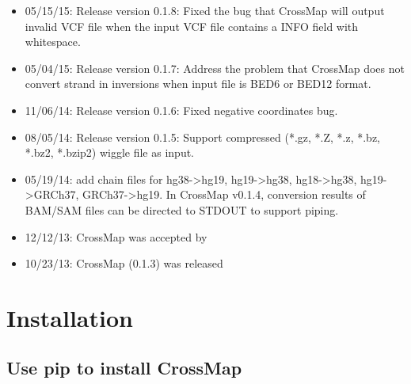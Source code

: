 \documentclass[letterpaper,10pt,english]{sphinxmanual}
\begin{document}
\begin{itemize}
\item {} 
05/15/15: Release version 0.1.8: Fixed the bug that CrossMap will output invalid VCF file when the input VCF file contains a INFO field with whitespace.

\item {} 
05/04/15: Release version 0.1.7: Address the problem that CrossMap does not convert strand in inversions when input file is BED6 or BED12 format.

\item {} 
11/06/14: Release version 0.1.6: Fixed \sphinxquotedblleft{}negative coordinates\sphinxquotedblright{} bug.

\item {} 
08/05/14: Release version 0.1.5: Support compressed (*.gz, *.Z, *.z, *.bz, *.bz2, *.bzip2) wiggle file as input.

\item {} 
05/19/14: add chain files for hg38-\textgreater{}hg19, hg19-\textgreater{}hg38, hg18-\textgreater{}hg38, hg19-\textgreater{}GRCh37, GRCh37-\textgreater{}hg19. In CrossMap v0.1.4, conversion results of BAM/SAM files can be directed to STDOUT to support piping.

\item {} 
12/12/13: CrossMap was accepted by 

\item {} 
10/23/13: CrossMap (0.1.3) was released

\end{itemize}


\chapter{Installation}
\label{\detokenize{index:installation}}

\section{Use pip to install CrossMap}
\label{\detokenize{index:use-pip-to-install-crossmap}}
\begin{sphinxVerbatim}[commandchars=\\\{\}]
    
    
\end{sphinxVerbatim}
\end{document}
